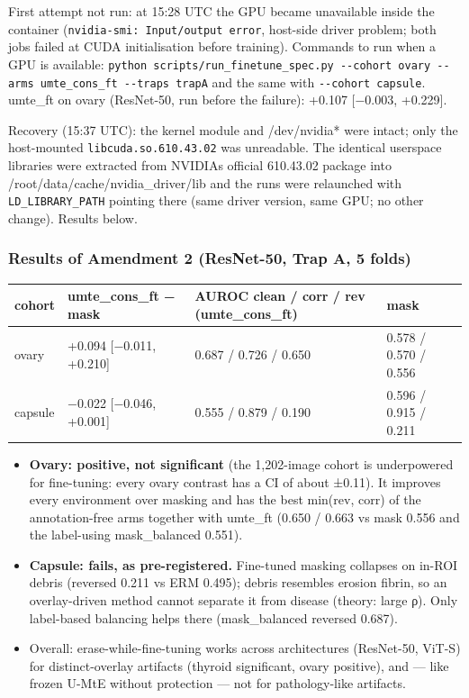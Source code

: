 {First attempt not run: at 15:28 UTC the GPU became unavailable inside the container (\texttt{nvidia-smi:\ Input/output\ error}, host-side
driver problem; both jobs failed at CUDA initialisation before training). Commands to run when a GPU is available:
\texttt{python\ scripts/run\_finetune\_spec.py\ -\/-cohort\ ovary\ -\/-arms\ umte\_cons\_ft\ -\/-traps\ trapA} and the same with
\texttt{-\/-cohort\ capsule}. umte\_ft on ovary (ResNet-50, run before the failure): +0.107 {[}−0.003, +0.229{]}.

Recovery (15:37 UTC): the kernel module and /dev/nvidia* were intact; only the host-mounted \texttt{libcuda.so.610.43.02}
was unreadable. The identical userspace libraries were extracted from NVIDIA\textquotesingle s official 610.43.02 package into
/root/data/cache/nvidia\_driver/lib and the runs were relaunched with \texttt{LD\_LIBRARY\_PATH} pointing there (same driver
version, same GPU; no other change). Results below.

\subsubsection{Results of Amendment 2 (ResNet-50, Trap A, 5 folds)}\label{results-of-amendment-2-resnet-50-trap-a-5-folds}

{ %
\begin{longtable}[]{@{}llll@{}}
\toprule\noalign{}
cohort & umte\_cons\_ft − mask & AUROC clean / corr / rev (umte\_cons\_ft) & mask \\
\midrule\noalign{}
\endhead
\bottomrule\noalign{}
\endlastfoot
ovary & +0.094 {[}−0.011, +0.210{]} & 0.687 / 0.726 / 0.650 & 0.578 / 0.570 / 0.556 \\
capsule & −0.022 {[}−0.046, +0.001{]} & 0.555 / 0.879 / 0.190 & 0.596 / 0.915 / 0.211 \\
\end{longtable}
}

\begin{itemize}

\item
  \textbf{Ovary: positive, not significant} (the 1,202-image cohort is underpowered for fine-tuning: every ovary contrast
  has a CI of about ±0.11). It improves every environment over masking and has the best min(rev, corr) of the
  annotation-free arms together with umte\_ft (0.650 / 0.663 vs mask 0.556 and the label-using mask\_balanced 0.551).
\item
  \textbf{Capsule: fails, as pre-registered.} Fine-tuned masking collapses on in-ROI debris (reversed 0.211 vs ERM 0.495);
  debris resembles erosion fibrin, so an overlay-driven method cannot separate it from disease (theory: large ρ).
  Only label-based balancing helps there (mask\_balanced reversed 0.687).
\item
  Overall: erase-while-fine-tuning works across architectures (ResNet-50, ViT-S) for distinct-overlay artifacts
  (thyroid significant, ovary positive), and --- like frozen U-MtE without protection --- not for pathology-like artifacts.
\end{itemize}

}
